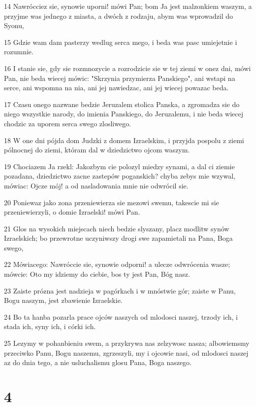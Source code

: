 \par 14 Nawrócciez sie, synowie uporni! mówi Pan; bom Ja jest malzonkiem waszym, a przyjme was jednego z miasta, a dwóch z rodzaju, abym was wprowadzil do Syonu,
\par 15 Gdzie wam dam pasterzy wedlug serca mego, i beda was pasc umiejetnie i rozumnie.
\par 16 I stanie sie, gdy sie rozmnozycie a rozrodzicie sie w tej ziemi w onez dni, mówi Pan, nie beda wiecej mówic: "Skrzynia przymierza Panskiego", ani wstapi na serce, ani wspomna na nia, ani jej nawiedzac, ani jej wiecej powazac beda.
\par 17 Czasu onego nazwane bedzie Jeruzalem stolica Panska, a zgromadza sie do niego wszystkie narody, do imienia Panskiego, do Jeruzalemu, i nie beda wiecej chodzic za uporem serca swego zlosliwego.
\par 18 W one dni pójda dom Judzki z domem Izraelskim, i przyjda pospolu z ziemi pólnocnej do ziemi, któram dal w dziedzictwo ojcom waszym.
\par 19 Chociazem Ja rzekl: Jakozbym cie polozyl miedzy synami, a dal ci ziemie pozadana, dziedzictwo zacne zastepów poganskich? chyba zebys mie wzywal, mówiac: Ojcze mój! a od nasladowania mnie nie odwrócil sie.
\par 20 Poniewaz jako zona przeniewierza sie mezowi swemu, takescie mi sie przeniewierzyli, o domie Izraelski! mówi Pan.
\par 21 Glos na wysokich miejscach niech bedzie slyszany, placz modlitw synów Izraelskich; bo przewrotne uczyniwszy drogi swe zapamietali na Pana, Boga swego,
\par 22 Mówiacego: Nawróccie sie, synowie odporni! a ulecze odwrócenia wasze; mówcie: Oto my idziemy do ciebie, bos ty jest Pan, Bóg nasz.
\par 23 Zaiste prózna jest nadzieja w pagórkach i w mnóstwie gór; zaiste w Panu, Bogu naszym, jest zbawienie Izraelskie.
\par 24 Bo ta hanba pozarla prace ojców naszych od mlodosci naszej, trzody ich, i stada ich, syny ich, i córki ich.
\par 25 Lezymy w pohanbieniu swem, a przykrywa nas zelzywosc nasza; albowiemsmy przeciwko Panu, Bogu naszemu, zgrzeszyli, my i ojcowie nasi, od mlodosci naszej az do dnia tego, a nie usluchalismu glosu Pana, Boga naszego.

\chapter{4}

